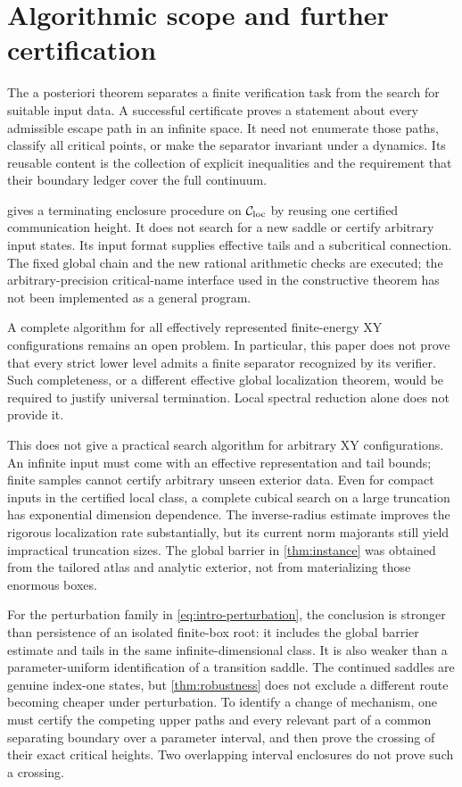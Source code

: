 \section{Algorithmic scope and further certification}\label{sec:discussion}

The a posteriori theorem separates a finite verification task from the search for suitable input data. A successful certificate proves a statement about every admissible escape path in an infinite space. It need not enumerate those paths, classify all critical points, or make the separator invariant under a dynamics. Its reusable content is the collection of explicit inequalities and the requirement that their boundary ledger cover the full continuum.

 gives a terminating enclosure procedure on
$\mathcal C_{\rm loc}$ by reusing one certified communication height.
It does not search for a new saddle or certify arbitrary input states.
Its input format supplies effective tails and a subcritical connection.
The fixed global chain and the new rational arithmetic checks are
executed; the arbitrary-precision critical-name interface used in the
constructive theorem has not been implemented as a general program.

A complete algorithm for all effectively represented finite-energy XY
configurations remains an open problem. In particular, this paper does
not prove that every strict lower level admits a finite separator
recognized by its verifier. Such completeness, or a different effective
global localization theorem, would be required to justify universal
termination. Local spectral reduction alone does not provide it.

This does not give a practical search algorithm for arbitrary XY configurations. An infinite input must come with an effective representation and tail bounds; finite samples cannot certify arbitrary unseen exterior data. Even for compact inputs in the certified local class, a complete cubical search on a large truncation has exponential dimension dependence. The inverse-radius estimate improves the rigorous localization rate substantially, but its current norm majorants still yield impractical truncation sizes. The global barrier in \cref{thm:instance} was obtained from the tailored atlas and analytic exterior, not from materializing those enormous boxes.

For the perturbation family in \cref{eq:intro-perturbation}, the conclusion is stronger than persistence of an isolated finite-box root: it includes the global barrier estimate and tails in the same infinite-dimensional class. It is also weaker than a parameter-uniform identification of a transition saddle. The continued saddles are genuine index-one states, but \cref{thm:robustness} does not exclude a different route becoming cheaper under perturbation. To identify a change of mechanism, one must certify the competing upper paths and every relevant part of a common separating boundary over a parameter interval, and then prove the crossing of their exact critical heights. Two overlapping interval enclosures do not prove such a crossing.

